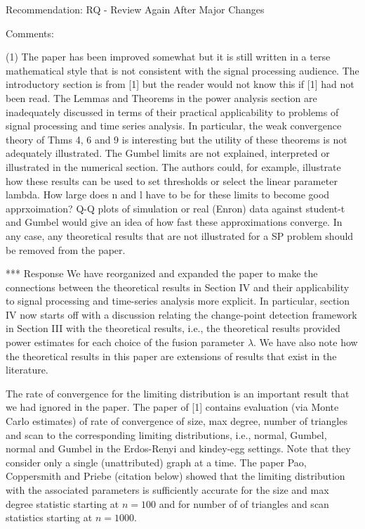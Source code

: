 Recommendation: RQ - Review Again After Major Changes

Comments:

(1) The paper has been improved somewhat but it is still written in a
terse mathematical style that is not consistent with the signal
processing audience. The introductory section is from [1] but the
reader would not know this if [1] had not been read.  The Lemmas and
Theorems in the power analysis section are inadequately discussed in
terms of their practical applicability to problems of signal
processing and time series analysis. In particular, the weak
convergence theory of Thms 4, 6 and 9 is interesting but the utility
of these theorems is not adequately illustrated.  The Gumbel limits
are not explained, interpreted or illustrated in the numerical
section. The authors could, for example, illustrate how these results
can be used to set thresholds or select the linear parameter
lambda. How large does n and l have to be for these limits to become
good apprxoimation? Q-Q plots of simulation or real (Enron) data
against student-t and Gumbel would give an idea of how fast these
approximations converge.  In any case, any theoretical results that
are not illustrated for a SP problem should be removed from the paper.

*** Response 
We have reorganized and expanded the paper to make the connections
between the theoretical results in Section IV and their applicability
to signal processing and time-series analysis more explicit. In
particular, section IV now starts off with a discussion relating the
change-point detection framework in Section III with the theoretical
results, i.e., the theoretical results provided power estimates for
each choice of the fusion parameter $\lambda$. We have also note how
the theoretical results in this paper are extensions of results that 
exist in the literature.

The rate of convergence for the limiting distribution is an important
result that we had ignored in the paper. The paper of [1] contains
evaluation (via Monte Carlo estimates) of rate of convergence of size,
max degree, number of triangles and scan to the corresponding limiting
distributions, i.e., normal, Gumbel, normal and Gumbel in the
Erdos-Renyi and kindey-egg settings. Note that they consider only a
single (unattributed) graph at a time. The paper Pao, Coppersmith and
Priebe (citation below) showed that the limiting distribution with the
associated parameters is sufficiently accurate for the size and max
degree statistic starting at $n = 100$ and for number of of triangles
and scan statistics starting at $n = 1000$.

